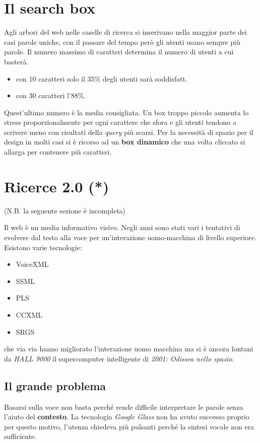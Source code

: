	\section{Il search box}
		Agli arbori del web nelle caselle di ricerca si inserivano nella maggior parte dei casi parole uniche, con il passare del tempo però gli utenti usano sempre più parole. Il numero massimo di caratteri determina il numero di utenti a cui basterà.
		\begin{itemize}
			\item con 10 caratteri solo il 35\% degli utenti sarà soddisfatt.
			\item con 30 caratteri l'88\%.
		\end{itemize}
		Quest'ultimo numero è la media consigliata. Un box troppo piccolo aumenta lo stress proporzionalmente per ogni carattere che sfora e gli utenti tendono a scrivere meno con risultati della \emph{query} più scarsi.
		Per la necessità di spazio per il design in molti casi si è ricorso ad un \textbf{box dinamico} che una volta cliccato si allarga per contenere più caratteri.
	
	\section{Ricerce 2.0 (*)}
		(N.B. la seguente sezione è incompleta)
		
		Il web è un media informativo visivo. Negli anni sono stati vari i tentativi di evolvere dal testo alla voce per un'interazione uomo-macchina di livello superiore. Esistono varie tecnologie:
		\begin{itemize}
			\item VoiceXML
			\item SSML
			\item PLS
			\item CCXML
			\item SRGS
		\end{itemize}
		che via via hanno migliorato l'interazione uomo macchina ma si è ancora lontani da \emph{HALL 9000} il supercomputer intelligente di \emph{2001: Odissea nello spazio}.
		
		\subsection{Il grande problema}
			Basarsi sulla voce non basta perché rende difficile interpretare le parole senza l'aiuto del \textbf{contesto}.
			La tecnologia \emph{Google Glass} non ha avuto successo proprio per questo motivo, l'utenza chiedeva più pulsanti perché la sintesi vocale non era sufficiente.
			
